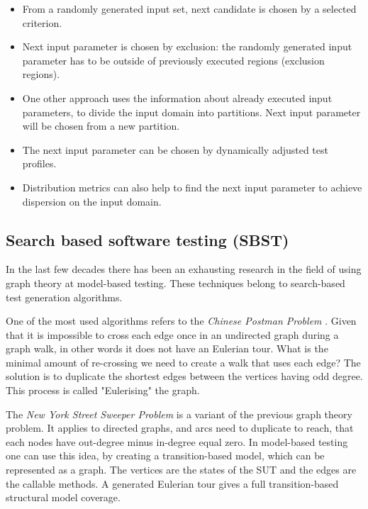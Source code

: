 \begin{itemize}
	\item From a randomly generated input set, next candidate is chosen by a selected criterion.
	\item Next input parameter is chosen by exclusion: the randomly generated input parameter has to be outside of previously executed regions (exclusion regions).
	\item One other approach uses the information about already executed input parameters, to divide the input domain into partitions. Next input parameter will be chosen from a new partition.
	\item The next input parameter can be chosen by dynamically adjusted test profiles.
	\item Distribution metrics can also help to find the next input parameter to achieve dispersion on the input domain.
\end{itemize}


\subsection{Search based software testing (SBST)}
\label{sub:searchbasedtestgen}

In the last few decades there has been an exhausting research in the field of using graph theory at model-based testing. These techniques belong to search-based test generation algorithms.

One of the most used algorithms refers to the \textit{Chinese Postman Problem} \cite{graphtheorymbt}. Given that it is impossible to cross each edge once in an undirected graph during a graph walk, in other words it does not have an Eulerian tour. What is the minimal amount of re-crossing we need to create a walk that uses each edge? The solution is to duplicate the shortest edges between the vertices having odd degree. This process is called "Eulerising" the graph.

The \textit{New York Street Sweeper Problem} is a variant of the previous graph theory problem. It applies to directed graphs, and arcs need to duplicate to reach, that each nodes have out-degree minus in-degree equal zero. In model-based testing one can use this idea, by creating a transition-based model, which can be represented as a graph. The vertices are the states of the SUT and the edges are the callable methods. A generated Eulerian tour gives a full transition-based structural model coverage.

